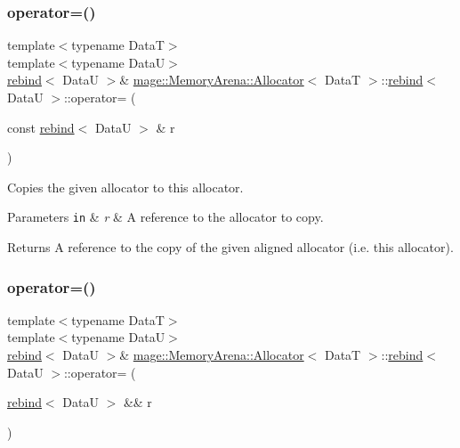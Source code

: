 \subsubsection{\texorpdfstring{operator=()}{operator=()}\hspace{0.1cm}{\footnotesize\ttfamily [1/2]}}
{\footnotesize\ttfamily template$<$typename DataT$>$ \\
template$<$typename DataU$>$ \\
\hyperlink{structmage_1_1_memory_arena_1_1_allocator_1_1rebind}{rebind}$<$ DataU $>$\& \hyperlink{structmage_1_1_memory_arena_1_1_allocator}{mage\+::\+Memory\+Arena\+::\+Allocator}$<$ DataT $>$\+::\hyperlink{structmage_1_1_memory_arena_1_1_allocator_1_1rebind}{rebind}$<$ DataU $>$\+::operator= (\begin{DoxyParamCaption}\item[{const \hyperlink{structmage_1_1_memory_arena_1_1_allocator_1_1rebind}{rebind}$<$ DataU $>$ \&}]{r }\end{DoxyParamCaption})\hspace{0.3cm}{\ttfamily [delete]}}

Copies the given allocator to this allocator.


\begin{DoxyParams}[1]{Parameters}
\mbox{\tt in}  & {\em r} & A reference to the allocator to copy. \\
\hline
\end{DoxyParams}
\begin{DoxyReturn}{Returns}
A reference to the copy of the given aligned allocator (i.\+e. this allocator). 
\end{DoxyReturn}
\hypertarget{structmage_1_1_memory_arena_1_1_allocator_1_1rebind_aa8013303077d1d9a193730edf3239427}{}\label{structmage_1_1_memory_arena_1_1_allocator_1_1rebind_aa8013303077d1d9a193730edf3239427} 
\subsubsection{\texorpdfstring{operator=()}{operator=()}\hspace{0.1cm}{\footnotesize\ttfamily [2/2]}}
{\footnotesize\ttfamily template$<$typename DataT$>$ \\
template$<$typename DataU$>$ \\
\hyperlink{structmage_1_1_memory_arena_1_1_allocator_1_1rebind}{rebind}$<$ DataU $>$\& \hyperlink{structmage_1_1_memory_arena_1_1_allocator}{mage\+::\+Memory\+Arena\+::\+Allocator}$<$ DataT $>$\+::\hyperlink{structmage_1_1_memory_arena_1_1_allocator_1_1rebind}{rebind}$<$ DataU $>$\+::operator= (\begin{DoxyParamCaption}\item[{\hyperlink{structmage_1_1_memory_arena_1_1_allocator_1_1rebind}{rebind}$<$ DataU $>$ \&\&}]{r }\end{DoxyParamCaption})\hspace{0.3cm}{\ttfamily [delete]}}

